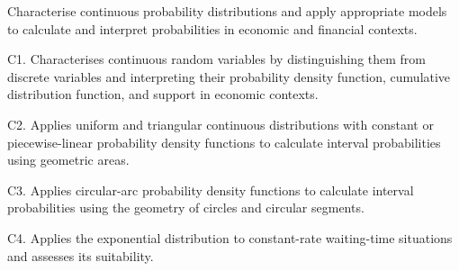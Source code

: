 \makeatletter
{}
\makeatother


\graphicspath{{./}{../}{../../}{../../../}{../../../../}{preamble/}{../preamble/}{../../preamble/}{../../../preamble/}{../../../../preamble/}}




\AtBeginDocument{%
	\fontsize{12.2pt}{13.84pt}\selectfont
}


	
	
	\vspace{0.1cm}
	\StudentInfo
	
	\LearningObjective
	{Characterise continuous probability distributions and apply appropriate models to calculate and interpret probabilities in economic and financial contexts.}
	{
		C1. Characterises continuous random variables by distinguishing them
		from discrete variables and interpreting their probability density
		function, cumulative distribution function, and support in economic
		contexts.\par
		C2. Applies uniform and triangular continuous distributions with
		constant or piecewise-linear probability density functions to
		calculate interval probabilities using geometric areas.\par
		C3. Applies circular-arc probability density functions to calculate
		interval probabilities using the geometry of circles and circular
		segments.\par
		C4. Applies the exponential distribution to constant-rate waiting-time
		situations and assesses its suitability.
	}
	
